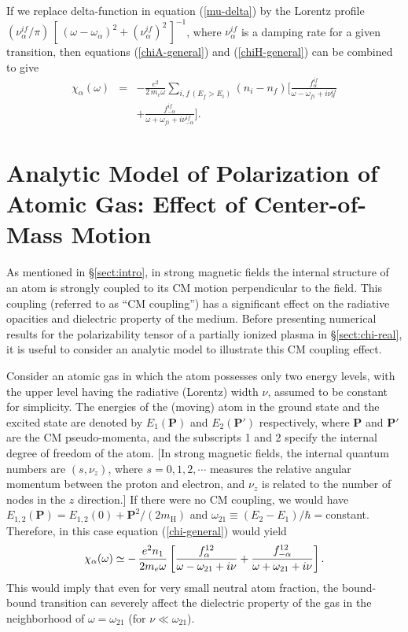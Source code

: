 \documentclass{emulateapj}
\newcommand{\beq}{\begin{equation}}
\newcommand{\eeq}{\end{equation}}
\newcommand{\req}[1]{equation (\ref{#1})}
\newcommand{\mel}{m_e}
\newcommand{\bP}{\bm{P}}
\newcommand{\mH}{m_\mathrm{H}}
\begin{document}
If we replace delta-function in \req{mu-delta}
by the Lorentz profile 
$(\nu^{if}_\alpha/\pi)\,
[\,(\omega-\omega_\alpha)^2+(\nu^{if}_\alpha)^2\,]^{-1}$,
where $\nu^{if}_\alpha$ is a damping rate for a given transition,
then 
equations (\ref{chiA-general}) and (\ref{chiH-general}) 
can be combined to give
\begin{eqnarray}
  \chi_\alpha(\omega) &=& - \frac{e^2}{2\,\mel\omega}
  \sum_{i,f\, (E_f>E_i)}
  (n_i-n_f) \Bigg[ 
  \frac{f^{if}_\alpha}{\omega-\omega_{fi}+i\nu^{if}_\alpha}
 \nonumber\\&&
   + \frac{f^{if}_{-\alpha}}{\omega+\omega_{fi}+i\nu^{if}_{-\alpha}}
   \Bigg].
\label{chi-general}
\end{eqnarray}

\section{Analytic Model of Polarization 
of Atomic Gas: Effect of Center-of-Mass Motion}
\label{sect:pert}

As mentioned in \S\ref{sect:intro}, in strong magnetic fields the
internal structure of an atom is strongly coupled to its CM motion
perpendicular to the field. This coupling (referred to as ``CM
coupling'') has a significant effect on the radiative opacities and
dielectric property of the medium. Before presenting numerical results
for the polarizability tensor of a partially ionized plasma in
\S\ref{sect:chi-real}, it is useful to consider an analytic model to
illustrate this CM coupling effect.

Consider an atomic gas in which the atom possesses only two energy
levels, with the upper level having the radiative (Lorentz) width $\nu$,
assumed to be constant for simplicity.
The energies of the (moving) atom in the ground state and the excited
state are denoted by $E_1(\bP)$ and $E_2(\bP')$ respectively, where $\bP$ 
and $\bP'$ are the CM pseudo-momenta, and the subscripts 1 and 2 specify 
the internal degree of freedom of the atom. [In strong magnetic fields,
the internal quantum numbers are $(s,\nu_z)$, where $s=0,1,2,\cdots$ 
measures the relative angular momentum between the proton and electron, 
and $\nu_z$ is related to the number of nodes in the $z$ direction.]
If there were no CM coupling, we would have 
$E_{1,2}(\bP)=E_{1,2}(0)+
\bP^2/(2\mH)$ and 
$\omega_{21}\equiv(E_2-E_1)/\hbar=$constant. 
Therefore, in this case
equation (\ref{chi-general}) would yield
\beq
\chi_\alpha(\omega)\simeq -\,{e^2n_1\over 2m_e\omega}
\left[{f_\alpha^{12}\over \omega-\omega_{21}+i\nu}
+ {f_{-\alpha}^{12}\over \omega+\omega_{21}+i\nu}\right].
\label{eq-wrong}
\eeq
This
would imply that even for very small neutral atom fraction,
the bound-bound transition can severely affect the dielectric property 
of the gas in the neighborhood of $\omega=\omega_{21}$
(for $\nu\ll\omega_{21}$).
\end{document}
